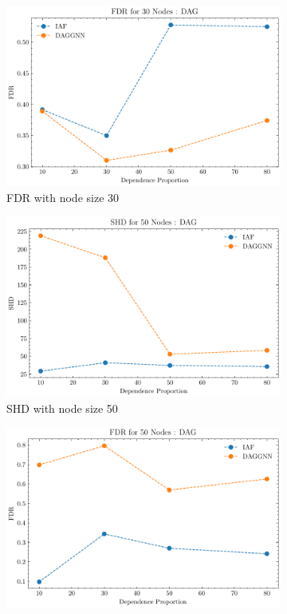 \documentclass[10pt]{article}
\begin{document}
\begin{figure}
\begin{subfigure}{0.45\textwidth}
        \includegraphics[width=\textwidth]{fig/FDR_dependence_30_DAG_threshold0.3.pdf}
        \caption{FDR with node size 30}
        \label{FDR_node30}
    \end{subfigure}
    \begin{subfigure}{0.45\textwidth}
        \includegraphics[width=\textwidth]{fig/SHD_dependence_50_DAG_threshold0.3.pdf}
        \caption{SHD with node size 50}
        \label{SHD_node50}
    \end{subfigure}
    \hfill
    \begin{subfigure}{0.45\textwidth}
        \includegraphics[width=\textwidth]{fig/FDR_dependence_50_DAG_threshold0.3.pdf}

\end{subfigure}
\end{figure}
\end{document}
